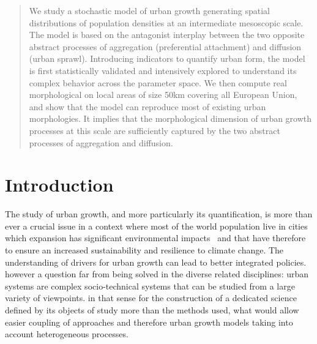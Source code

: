 \documentclass[10pt,letterpaper]{article}
\begin{document}
\begin{abstract}
\justify
We study a stochastic model of urban growth generating spatial distributions of population densities at an intermediate mesoscopic scale. The model is based on the antagonist interplay between the two opposite abstract processes of aggregation (preferential attachment) and diffusion (urban sprawl). Introducing indicators to quantify  urban form, the model is first statistically validated and intensively explored to understand its complex behavior across the parameter space. We then compute real morphological  on local areas of size 50km covering all European Union, and show that the model can reproduce most of  existing urban morphologies. It implies that the morphological dimension of urban growth processes at this scale are sufficiently captured by the two abstract processes of aggregation and diffusion.
\end{abstract}



\linenumbers

\justify


\section*{Introduction}


The study of urban growth, and more particularly its quantification, is more than ever a crucial issue in a context where most of the world population live in cities which expansion has significant environmental impacts~\cite{seto2012global} and that have therefore to ensure an increased sustainability and resilience to climate change. The understanding of drivers for urban growth can lead to better integrated policies.  however a question far from being solved in the diverse related disciplines: urban systems are complex socio-technical systems that can be studied from a large variety of viewpoints. \cite{batty2013new}  in that sense for the construction of a dedicated science defined by its objects of study more than the methods used, what would allow easier coupling of approaches and therefore urban growth models taking into account heterogeneous processes.
\end{document}

